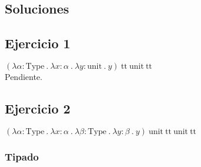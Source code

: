 \documentclass[a4paper]{article}
\newcommand{\Type}{\text{Type}}
\newcommand{\TT}{\text{tt}}
\newcommand{\Unit}{\text{unit}}
\begin{document}
\begin{landscape}


\newpage

\section{Soluciones}




\subsection{Ejercicio 1}

$(\lambda \alpha : \Type\ .\
  \lambda x : \alpha\ .\
  \lambda y : \Unit\ .\
  y)\
 \TT\ \Unit\ \TT$ \\

Pendiente.




\newpage

\subsection{Ejercicio 2}

$(\lambda \alpha : \Type\ .\
  \lambda x : \alpha\ .\
  \lambda \beta : \Type\ .\
  \lambda y : \beta\ .\
  y)\
 \Unit\ \TT\ \Unit\ \TT$ \\


\subsubsection{Tipado}


\end{landscape}
\end{document}
